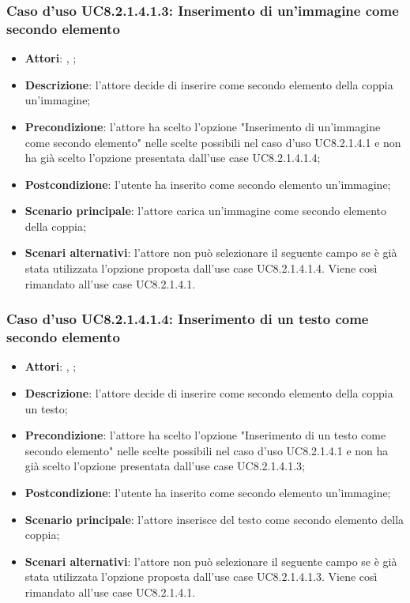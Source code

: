 		\subsubsection{Caso d'uso UC8.2.1.4.1.3: Inserimento di un'immagine come secondo elemento}
		\label{UC8.2.1.4.1.3}
		\begin{itemize}
			\item \textbf{Attori}: \uau, \uaupro;
			\item \textbf{Descrizione}: l'attore decide di inserire come secondo elemento della coppia un'immagine;
			\item \textbf{Precondizione}: l'attore ha scelto l'opzione "Inserimento di un'immagine come secondo elemento" nelle scelte possibili nel caso d'uso UC8.2.1.4.1 e non ha già scelto l'opzione presentata dall'use case UC8.2.1.4.1.4;
			\item \textbf{Postcondizione}: l'utente ha inserito come secondo elemento un'immagine;
			\item \textbf{Scenario principale}: l'attore carica un'immagine come secondo elemento della coppia;  
			\item \textbf{Scenari alternativi}: l'attore non può selezionare il seguente campo se è già stata utilizzata l'opzione proposta dall'use case UC8.2.1.4.1.4. Viene così rimandato all'use case UC8.2.1.4.1.
		\end{itemize}
		
		\subsubsection{Caso d'uso UC8.2.1.4.1.4: Inserimento di un testo come secondo elemento}
		\label{UC8.2.1.4.1.4}
		\begin{itemize}
			\item \textbf{Attori}: \uau, \uaupro;
			\item \textbf{Descrizione}: l'attore decide di inserire come secondo elemento della coppia un testo;
			\item \textbf{Precondizione}: l'attore ha scelto l'opzione "Inserimento di un testo come secondo elemento" nelle scelte possibili nel caso d'uso UC8.2.1.4.1 e non ha già scelto l'opzione presentata dall'use case UC8.2.1.4.1.3;
			\item \textbf{Postcondizione}: l'utente ha inserito come secondo elemento un'immagine;
			\item \textbf{Scenario principale}: l'attore inserisce del testo come secondo elemento della coppia;  
			\item \textbf{Scenari alternativi}: l'attore non può selezionare il seguente campo se è già stata utilizzata l'opzione proposta dall'use case UC8.2.1.4.1.3. Viene così rimandato all'use case UC8.2.1.4.1.
		\end{itemize}
	
